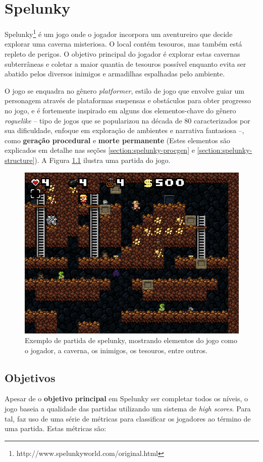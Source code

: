 \chapter{\label{chap:spelunky}Spelunky}
Spelunky\footnote{http://www.spelunkyworld.com/original.html} é um jogo onde o
jogador incorpora um aventureiro que decide explorar uma caverna misteriosa. O
local contém tesouros, mas também está repleto de perigos. O objetivo principal
do jogador é explorar estas cavernas subterrâneas e coletar a maior quantia de
tesouros possível enquanto evita ser abatido pelos diversos inimigos e
armadilhas espalhadas pelo ambiente.

O jogo se enquadra no gênero \textit{platformer}, estilo de jogo que envolve
guiar um personagem através de plataformas suspensas e obstáculos para obter
progresso no jogo, e é fortemente inspirado em alguns dos elementos-chave do
gênero \textit{roguelike} -- tipo de jogos que se popularizou na década de 80
caracterizados por sua dificuldade, enfoque em exploração de ambientes e
narrativa fantasiosa --, como \textbf{geração procedural} e \textbf{morte
permanente} (Estes elementos são explicados em detalhe nas seções
\ref{section:spelunky-procgen} e \ref{section:spelunky-structure}). A Figura
\ref{fig:spelunky-gameplay} ilustra uma partida do jogo.

\begin{figure}[htb!]
\centering
\includegraphics[width=.65\textwidth]{fig/spelunky-pc-screen.png}
\caption{\label{fig:spelunky-gameplay}Exemplo de partida de spelunky, mostrando
elementos do jogo como o jogador, a caverna, os inimigos, os tesouros, entre
outros.}
\end{figure}


\section{\label{section:spelunky-goals}Objetivos}
Apesar de o \textbf{objetivo principal} em Spelunky ser completar todos os
níveis, o jogo baseia a qualidade das partidas utilizando um sistema de
\textit{high scores}. Para tal, faz uso de uma série de métricas para
classificar os jogadores ao término de uma partida. Estas métricas são:

